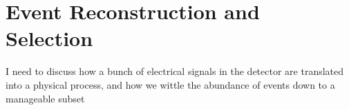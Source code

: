 \chapter{Event Reconstruction and Selection}

I need to discuss how a bunch of electrical signals in the detector are translated into a physical process,
and how we wittle the abundance of events down to a manageable subset
